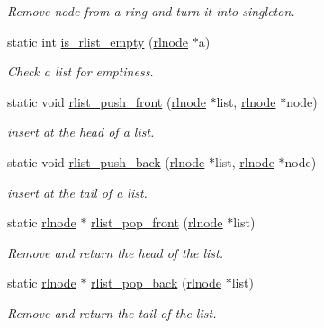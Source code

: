 \begin{DoxyCompactItemize}
\begin{DoxyCompactList}\small\item\em Remove node from a ring and turn it into singleton. \end{DoxyCompactList}\item 
static int \hyperlink{group__rlists_gaf60549214daf0df46bcd1a0d5ba5b661}{is\+\_\+rlist\+\_\+empty} (\hyperlink{group__rlists_ga8f6244877f7ce2322c90525217ea6e7a}{rlnode} $\ast$a)
\begin{DoxyCompactList}\small\item\em Check a list for emptiness. \end{DoxyCompactList}\item 
static void \hyperlink{group__rlists_ga63ab59e50f2007a6bfedb0180a73b06f}{rlist\+\_\+push\+\_\+front} (\hyperlink{group__rlists_ga8f6244877f7ce2322c90525217ea6e7a}{rlnode} $\ast$list, \hyperlink{group__rlists_ga8f6244877f7ce2322c90525217ea6e7a}{rlnode} $\ast$node)
\begin{DoxyCompactList}\small\item\em insert at the head of a list. \end{DoxyCompactList}\item 
static void \hyperlink{group__rlists_gac454004e8fb74ccd539e7fbd1affa86a}{rlist\+\_\+push\+\_\+back} (\hyperlink{group__rlists_ga8f6244877f7ce2322c90525217ea6e7a}{rlnode} $\ast$list, \hyperlink{group__rlists_ga8f6244877f7ce2322c90525217ea6e7a}{rlnode} $\ast$node)
\begin{DoxyCompactList}\small\item\em insert at the tail of a list. \end{DoxyCompactList}\item 
static \hyperlink{group__rlists_ga8f6244877f7ce2322c90525217ea6e7a}{rlnode} $\ast$ \hyperlink{group__rlists_ga5cc2be48f94a7573fb8952356c6ba7d1}{rlist\+\_\+pop\+\_\+front} (\hyperlink{group__rlists_ga8f6244877f7ce2322c90525217ea6e7a}{rlnode} $\ast$list)
\begin{DoxyCompactList}\small\item\em Remove and return the head of the list. \end{DoxyCompactList}\item 
static \hyperlink{group__rlists_ga8f6244877f7ce2322c90525217ea6e7a}{rlnode} $\ast$ \hyperlink{group__rlists_ga55f998d5871e6e563b4320392995a6c5}{rlist\+\_\+pop\+\_\+back} (\hyperlink{group__rlists_ga8f6244877f7ce2322c90525217ea6e7a}{rlnode} $\ast$list)
\begin{DoxyCompactList}\small\item\em Remove and return the tail of the list. \end{DoxyCompactList}\item 

\end{DoxyCompactItemize}
